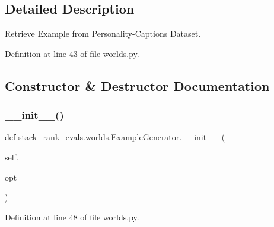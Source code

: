 \subsection{Detailed Description}
\begin{DoxyVerb}Retrieve Example from Personality-Captions Dataset.
\end{DoxyVerb}
 

Definition at line 43 of file worlds.\+py.



\subsection{Constructor \& Destructor Documentation}
\mbox{\label{classstack__rank__evals_1_1worlds_1_1ExampleGenerator_a6b15b72b85a0358bb6c171ef6b183c9d}} 
\subsubsection{\texorpdfstring{\+\_\+\+\_\+init\+\_\+\+\_\+()}{\_\_init\_\_()}\hspace{0.1cm}{\footnotesize\ttfamily [1/2]}}
{\footnotesize\ttfamily def stack\+\_\+rank\+\_\+evals.\+worlds.\+Example\+Generator.\+\_\+\+\_\+init\+\_\+\+\_\+ (\begin{DoxyParamCaption}\item[{}]{self,  }\item[{}]{opt }\end{DoxyParamCaption})}



Definition at line 48 of file worlds.\+py.


